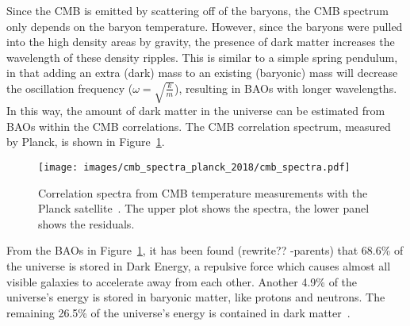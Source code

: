 Since the CMB is emitted by scattering off of the baryons, the CMB spectrum only depends on the baryon temperature.
However, since the baryons were pulled into the high density areas by gravity, the presence of dark matter increases the wavelength of these density ripples.
This is similar to a simple spring pendulum, in that adding an extra (dark) mass to an existing (baryonic) mass will decrease the oscillation frequency ($\omega = \sqrt{\frac{k}{m}}$), resulting in BAOs with longer wavelengths.
In this way, the amount of dark matter in the universe can be estimated from BAOs within the CMB correlations.
The CMB correlation spectrum, measured by Planck, is shown in Figure~\ref{fig:cmb_correlation_spectra}.

\begin{figure}[t]
  \centering
  \texttt{[image: images/cmb\_spectra\_planck\_2018/cmb\_spectra.pdf]}
  \caption[Cosmic Micrwave Background Correlation Spectrum]{
    Correlation spectra from CMB temperature measurements with the Planck satellite~\cite{planck_dm_limit}.
    The upper plot shows the spectra, the lower panel shows the residuals.
  }
  \label{fig:cmb_correlation_spectra}
\end{figure}

{\color{red}From the BAOs in Figure~\ref{fig:cmb_correlation_spectra}, it has been found (rewrite?? -parents)} that 68.6\% of the universe is stored in Dark Energy, a repulsive force which causes almost all visible galaxies to accelerate away from each other.
Another 4.9\% of the universe's energy is stored in baryonic matter, like protons and neutrons.
The remaining 26.5\% of the universe's energy is contained in dark matter~\cite{planck2015}.



